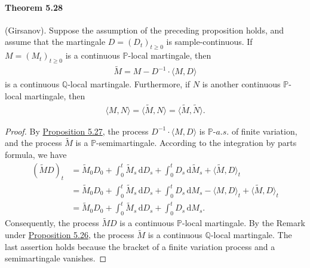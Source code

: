 \documentclass{article}
\numberwithin{equation}{section}
\renewcommand{\P}{\mathbb{P}}
\newcommand{\bbP}{\mathbb{P}}
\newcommand{\bbQ}{\mathbb{Q}}
\renewcommand{\d}{\mathrm{d}}
\theoremstyle{plain}
\theoremstyle{definition}
\begin{document}
\paragraph{Theorem 5.28\label{thm:5.28}} (Girsanov). Suppose the assumption of the preceding proposition holds, and assume that the martingale $D=(D_t)_{t\geq 0}$ is sample-continuous. If $M=(M_t)_{t\geq 0}$ is a continuous $\P$-local martingale, then
\begin{align*}
	\widetilde{M} = M - D^{-1}\cdot \langle M,D\rangle
\end{align*}
is a continuous $\bbQ$-local martingale. Furthermore, if $N$ is another continuous $\P$-local martingale, then
\begin{align*}
	\langle M,N\rangle = \langle\widetilde{M},N\rangle = \langle\widetilde{M},\widetilde{N}\rangle.
\end{align*}
\begin{proof}
By \hyperref[prop:5.27]{Proposition 5.27}, the process $D^{-1}\cdot\langle M,D\rangle$ is $\P$-$a.s.$ of finite variation, and the process $\widetilde{M}$ is a $\P$-semimartingale. According to the integration by parts formula, we have
\begin{align*}
	(\widetilde{M}D)_t &= \widetilde{M}_0D_0 + \int_0^t \widetilde{M}_s\,\d D_s +\int_0^t D_s\,\d\widetilde{M}_s + \langle\widetilde{M},D\rangle_t\\
	&=\widetilde{M}_0D_0 + \int_0^t \widetilde{M}_s\,\d D_s +\int_0^tD_s\,\d M_s - \langle M,D\rangle_t + \langle\widetilde{M},D\rangle_t\\
	&=\widetilde{M}_0D_0 + \int_0^t \widetilde{M}_s\,\d D_s +\int_0^t D_s\,\d M_s.
\end{align*}
Consequently, the process $\widetilde{M}D$ is a continuous $\bbP$-local martingale. By the Remark under \hyperref[prop:5.26]{Proposition 5.26}, the process $\widetilde{M}$ is a continuous $\bbQ$-local martingale. The last assertion holds because the bracket of a finite variation process and a semimartingale vanishes.
\end{proof}
\end{document}
